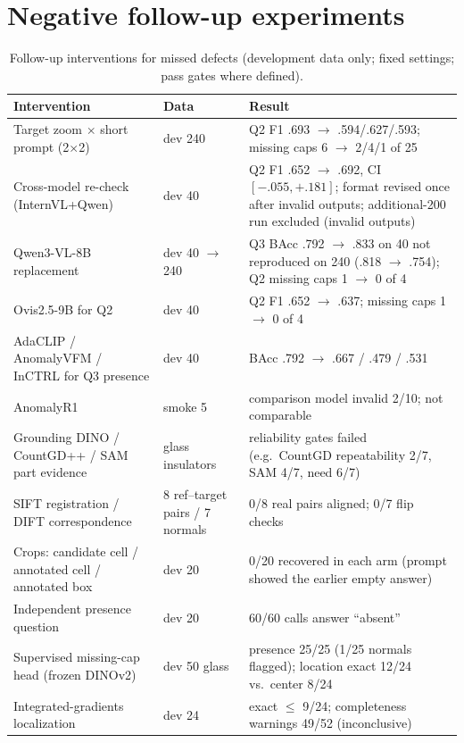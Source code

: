 \documentclass[11pt]{article}
\begin{document}
\section{Negative follow-up experiments}
\begin{table}[h]
\centering
\caption{Follow-up interventions for missed defects (development data only; fixed settings; pass gates where defined).}
\label{tab:negative}
\small
\begin{tabular}{p{4.3cm}p{2.2cm}p{6.8cm}}
\toprule
Intervention & Data & Result \\
\midrule
Target zoom $\times$ short prompt (2$\times$2) & dev 240 & Q2 F1 .693 $\rightarrow$ .594/.627/.593; missing caps 6 $\rightarrow$ 2/4/1 of 25 \\
Cross-model re-check (InternVL+Qwen) & dev 40 & Q2 F1 .652 $\rightarrow$ .692, CI $[-.055,+.181]$; format revised once after invalid outputs; additional-200 run excluded (invalid outputs) \\
Qwen3-VL-8B replacement & dev 40 $\rightarrow$ 240 & Q3 BAcc .792 $\rightarrow$ .833 on 40 not reproduced on 240 (.818 $\rightarrow$ .754); Q2 missing caps 1 $\rightarrow$ 0 of 4 \\
Ovis2.5-9B for Q2 & dev 40 & Q2 F1 .652 $\rightarrow$ .637; missing caps 1 $\rightarrow$ 0 of 4 \\
AdaCLIP / AnomalyVFM / InCTRL for Q3 presence & dev 40 & BAcc .792 $\rightarrow$ .667 / .479 / .531 \\
AnomalyR1 & smoke 5 & comparison model invalid 2/10; not comparable \\
Grounding DINO / CountGD++ / SAM part evidence & glass insulators & reliability gates failed (e.g.\ CountGD repeatability 2/7, SAM 4/7, need 6/7) \\
SIFT registration / DIFT correspondence & 8 ref--target pairs / 7 normals & 0/8 real pairs aligned; 0/7 flip checks \\
Crops: candidate cell / annotated cell / annotated box & dev 20 & 0/20 recovered in each arm (prompt showed the earlier empty answer) \\
Independent presence question & dev 20 & 60/60 calls answer ``absent'' \\
Supervised missing-cap head (frozen DINOv2) & dev 50 glass & presence 25/25 (1/25 normals flagged); location exact 12/24 vs.\ center 8/24 \\
Integrated-gradients localization & dev 24 & exact $\le$ 9/24; completeness warnings 49/52 (inconclusive) \\
\bottomrule
\end{tabular}
\end{table}
\end{document}
